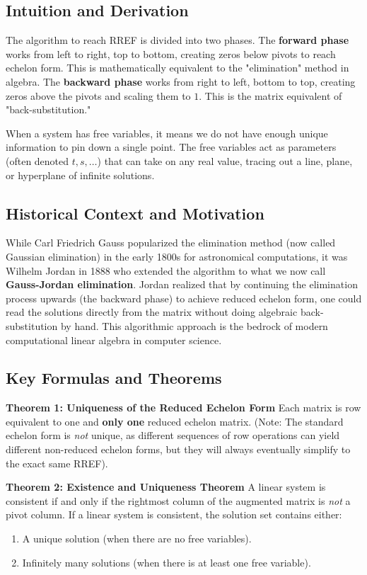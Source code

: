 \documentclass[11pt]{article}
\begin{document}
\subsection{Intuition and Derivation}
The algorithm to reach RREF is divided into two phases. The \textbf{forward phase} works from left to right, top to bottom, creating zeros below pivots to reach echelon form. This is mathematically equivalent to the "elimination" method in algebra. The \textbf{backward phase} works from right to left, bottom to top, creating zeros above the pivots and scaling them to $1$. This is the matrix equivalent of "back-substitution."

When a system has free variables, it means we do not have enough unique information to pin down a single point. The free variables act as parameters (often denoted $t, s, \dots$) that can take on any real value, tracing out a line, plane, or hyperplane of infinite solutions.

\subsection{Historical Context and Motivation}
While Carl Friedrich Gauss popularized the elimination method (now called Gaussian elimination) in the early 1800s for astronomical computations, it was Wilhelm Jordan in 1888 who extended the algorithm to what we now call \textbf{Gauss-Jordan elimination}. Jordan realized that by continuing the elimination process upwards (the backward phase) to achieve reduced echelon form, one could read the solutions directly from the matrix without doing algebraic back-substitution by hand. This algorithmic approach is the bedrock of modern computational linear algebra in computer science.

\subsection{Key Formulas and Theorems}
\textbf{Theorem 1: Uniqueness of the Reduced Echelon Form}
Each matrix is row equivalent to one and \textbf{only one} reduced echelon matrix. (Note: The standard echelon form is \textit{not} unique, as different sequences of row operations can yield different non-reduced echelon forms, but they will always eventually simplify to the exact same RREF).

\textbf{Theorem 2: Existence and Uniqueness Theorem}
A linear system is consistent if and only if the rightmost column of the augmented matrix is \textit{not} a pivot column. If a linear system is consistent, the solution set contains either:
\begin{enumerate}
    \item A unique solution (when there are no free variables).
    \item Infinitely many solutions (when there is at least one free variable).
\end{enumerate}
\end{document}
